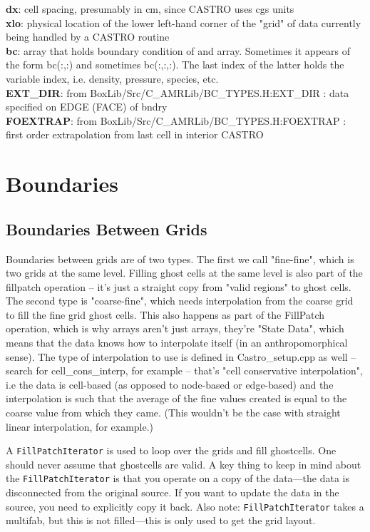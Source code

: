 {\bf dx}: cell spacing, presumably in cm, since CASTRO uses cgs
units\\

{\bf xlo}: physical location of the lower left-hand corner of the
"grid" of data currently being handled by a CASTRO routine\\

{\bf bc}: array that holds boundary condition of and array. Sometimes
it appears of the form bc(:,:) and sometimes bc(:,:,:). The last index
of the latter holds the variable index, i.e. density, pressure,
species, etc.\\

{\bf EXT\_DIR}: from BoxLib/Src/C\_AMRLib/BC\_TYPES.H:EXT\_DIR : data
specified on EDGE (FACE) of bndry\\

{\bf FOEXTRAP}: from BoxLib/Src/C\_AMRLib/BC\_TYPES.H:FOEXTRAP : first
order extrapolation from last cell in interior CASTRO

\section{Boundaries}
\subsection{Boundaries Between Grids}
Boundaries between grids are of two types. The first we call
"fine-fine", which is two grids at the same level.  Filling ghost
cells at the same level is also part of the fillpatch operation --
it's just a straight copy from "valid regions" to ghost cells. The
second type is "coarse-fine", which needs interpolation from the
coarse grid to fill the fine grid ghost cells.  This also happens as
part of the FillPatch operation, which is why arrays aren't just
arrays, they're "State Data", which means that the data knows how to
interpolate itself (in an anthropomorphical sense).  The type of
interpolation to use is defined in Castro\_setup.cpp as well -- search
for cell\_cons\_interp, for example -- that's "cell conservative
interpolation", i.e the data is cell-based (as opposed to node-based
or edge-based) and the interpolation is such that the average of the
fine values created is equal to the coarse value from which they came.
(This wouldn't be the case with straight linear interpolation, for
example.)

A {\tt FillPatchIterator} is used to loop over the grids and fill
ghostcells.  One should never assume that ghostcells are valid.  A key
thing to keep in mind about the {\tt FillPatchIterator} is that you
operate on a copy of the data---the data is disconnected from the
original source.  If you want to update the data in the source,
you need to explicitly copy it back.  Also note: {\tt FillPatchIterator}
takes a multifab, but this is not filled---this is only used to
get the grid layout.   

